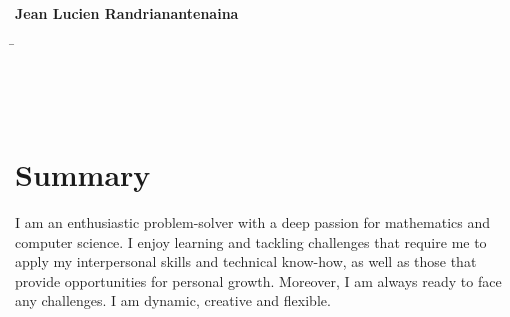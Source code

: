 \documentclass[a4paper,10pt]{article}
\begin{document}
\begin{minipage}[H][3cm][t]{\dimexpr\linewidth-3.1cm\relax}
	\textbf{\LARGE Jean Lucien Randrianantenaina}
	\begin{tabbing}
		\hspace{6.95cm}\=\kill
		\> \\
		\>  \\
		\> \\
		\> \\
	\end{tabbing}
\end{minipage}\begin{minipage}[H][3cm][t]{1.5cm}
\end{minipage}

\section{Summary}
\begin{adjustwidth}{\parindent}{\parindent}
	I am an enthusiastic problem-solver with a deep passion for mathematics and computer science. I enjoy learning and tackling challenges that require me to apply my interpersonal skills and technical know-how, as well as those that provide opportunities for personal growth. Moreover, I am always ready to face any challenges. I am dynamic, creative and flexible.
\end{adjustwidth}
\end{document}
